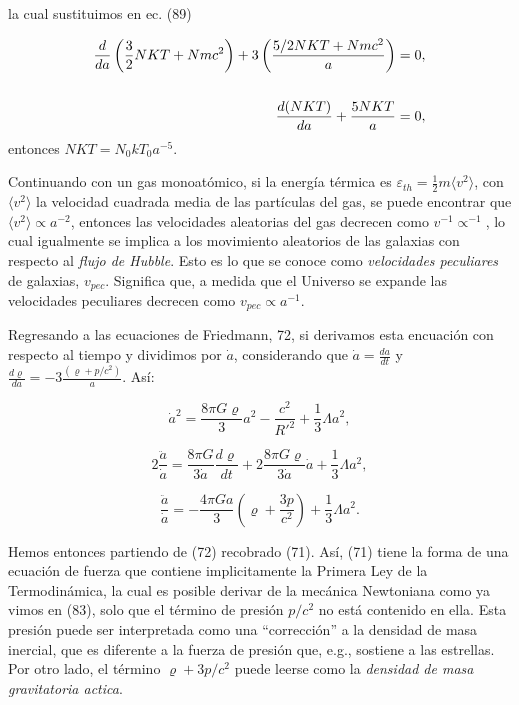 \documentclass[11pt]{article}
\begin{document}
    la cual sustituimos en ec. (89)
    
    \begin{align}
        \frac{d}{da} \left( \frac{3}{2} NKT + Nmc^2 \right) + 3 \left( \frac{5/2 NKT + Nmc^2}{a} \right) = 0, \notag \\
        \notag \\
        \frac{d(NKT)}{da} + \frac{5NKT}{a}  = 0,
    \end{align}
     entonces $NKT = N_0kT_0 a^{-5}$.
    
    Continuando con un gas monoatómico, si la energía térmica es $\varepsilon_{th} =  \frac{1}{2}m \langle v^2 \rangle$, con $ \langle v^2 \rangle$ la velocidad cuadrada media de las partículas del gas, se puede encontrar que $ \langle v^2 \rangle \propto a^{-2}$, entonces las velocidades aleatorias del gas decrecen como $v^{-1} \propto^{-1}$, lo cual igualmente se implica a los movimiento aleatorios de las galaxias con respecto al {\textit{flujo de Hubble}}. Esto es lo que se conoce como {\textit{velocidades peculiares}} de galaxias, $v_{pec}$. Significa que, a medida que el Universo se expande las velocidades peculiares decrecen como $v_{pec} \propto a^{-1}$.
    
    Regresando a las ecuaciones de Friedmann, 72, si derivamos esta encuación con respecto al tiempo y dividimos por $\dot{a}$, considerando que $\dot{a} = \frac{da}{dt}$ y  $\frac{d\varrho}{da} = - 3 \frac{(\varrho + p/c^2)}{a}$. Así: 
    
    \begin{equation}
        \boxed{\dot{a}^2 =  \frac{8 \pi G \varrho}{3} a^2 - \frac{c^2}{R'^2} + \frac{1}{3} \Lambda a^2,}
    \end{equation}
    
    \begin{equation*}
        2 \frac{\ddot{a}}{\dot{a}} =  \frac{8 \pi G}{3\dot{a}} \frac{d\varrho}{dt} +  2\frac{8 \pi G \varrho}{3 \dot{a}} \dot{a} + \frac{1}{3} \Lambda a^2,
    \end{equation*}
           
    \begin{equation}
        \boxed{\frac{\ddot{a}}{\dot{a}} = - \frac{4 \pi G a}{3} \left(\varrho + \frac{3p}{c^2} \right) + \frac{1}{3} \Lambda a^2}.
    \end{equation}
         
    Hemos entonces partiendo de (72) recobrado (71). Así, (71) tiene la forma de una ecuación de fuerza que contiene implicitamente la Primera Ley de la Termodinámica, la cual es posible derivar de la mecánica Newtoniana como ya vimos en (83), solo que el término de presión $p/c^2$ no está contenido en ella. Esta presión puede ser interpretada como una ``corrección'' a la densidad de masa inercial, que es diferente a la fuerza de presión que, e.g., sostiene a las estrellas. 
    Por otro lado, el término $\varrho + 3p/c^2$ puede leerse como la {\textit{densidad de masa gravitatoria actica}}. 
        
\end{document}
